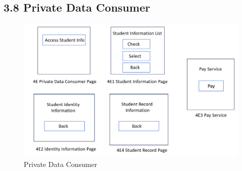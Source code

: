 \documentclass[a4paper,12pt]{article}
\begin{document}
\subsection*{3.8 Private Data Consumer}
\begin{figure}[H]
    \begin{center}
        \includegraphics[width=\textwidth]{picture/WechatIMG1921.jpg}
        \caption{Private Data Consumer}
        \label{fig:provide-course-info}
    \end{center}
\end{figure}
\end{document}
